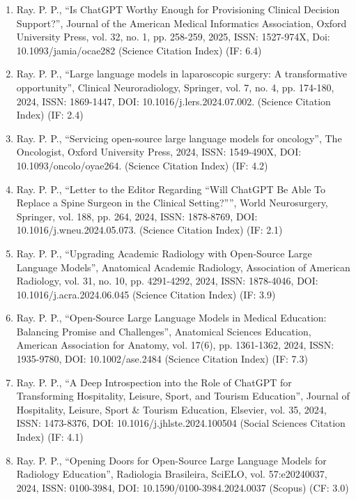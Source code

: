 \documentclass[11pt,a4paper]{moderncv}
\begin{document}
\begin{adjustwidth}{6em}{0pt}
\begin{enumerate}
		\item Ray. P. P., “Is ChatGPT Worthy Enough for Provisioning Clinical Decision Support?”, Journal of the American Medical Informatics Association, Oxford University Press, vol. 32, no. 1, pp. 258-259, 2025, ISSN: 1527-974X, Doi: 10.1093/jamia/ocae282 (Science Citation Index) (IF: 6.4)
		
		\item Ray. P. P., “Large language models in laparoscopic surgery: A transformative opportunity”, Clinical Neuroradiology, Springer, vol. 7, no. 4, pp. 174-180, 2024, ISSN: 1869-1447, DOI: 10.1016/j.lers.2024.07.002. (Science Citation Index) (IF: 2.4)
		
		\item Ray. P. P., “Servicing open-source large language models for oncology”, The Oncologist, Oxford University Press, 2024, ISSN: 1549-490X, DOI: 10.1093/oncolo/oyae264. (Science Citation Index) (IF: 4.2)
		
		\item Ray. P. P., “Letter to the Editor Regarding “Will ChatGPT Be Able To Replace a Spine Surgeon in the Clinical Setting?””, World Neurosurgery, Springer, vol. 188, pp. 264, 2024, ISSN: 1878-8769, DOI: 10.1016/j.wneu.2024.05.073. (Science Citation Index) (IF: 2.1)
		
		\item Ray. P. P., “Upgrading Academic Radiology with Open-Source Large Language Models”, Anatomical Academic Radiology, Association of American Radiology, vol. 31, no. 10, pp. 4291-4292, 2024, ISSN: 1878-4046, DOI: 10.1016/j.acra.2024.06.045 (Science Citation Index) (IF: 3.9)
		
		\item Ray. P. P., “Open-Source Large Language Models in Medical Education: Balancing Promise and Challenges”, Anatomical Sciences Education, American Association for Anatomy, vol. 17(6), pp. 1361-1362, 2024, ISSN: 1935-9780, DOI: 10.1002/ase.2484 (Science Citation Index) (IF: 7.3)
		
		\item Ray. P. P., “A Deep Introspection into the Role of ChatGPT for Transforming Hospitality, Leisure, Sport, and Tourism Education”, Journal of Hospitality, Leisure, Sport \& Tourism Education, Elsevier, vol. 35, 2024, ISSN: 1473-8376, DOI: 10.1016/j.jhlste.2024.100504 (Social Sciences Citation Index) (IF: 4.1)
		
		\item Ray. P. P., “Opening Doors for Open-Source Large Language Models for Radiology Education”, Radiologia Brasileira, SciELO, vol. 57:e20240037, 2024, ISSN: 0100-3984, DOI: 10.1590/0100-3984.2024.0037 (Scopus) (CF: 3.0)
		

\end{enumerate}
\end{adjustwidth}
\end{document}
